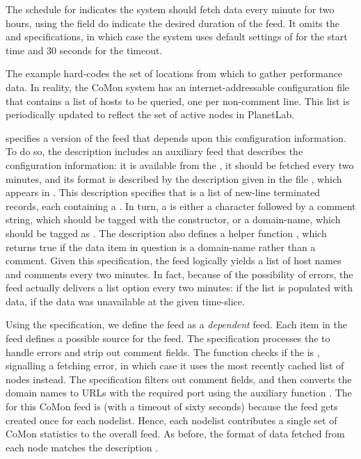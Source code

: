 The schedule for  indicates the system should fetch data
every minute for two hours, using the  field do indicate
the desired duration of the feed.  It omits the  and
 specifications, in which case the system uses default
settings of  for the start time and 30 seconds for the
timeout.  

The  example hard-codes the set of locations from
which to gather performance data.  In reality, the CoMon system has an
internet-addressable configuration file that contains a list of hosts
to be queried, one per non-comment line. This list is periodically
updated to reflect the set of active nodes in PlanetLab. 

 specifies a version of the  feed that
depends upon this configuration information.  To do so, the
description includes an auxiliary feed  that describes the
configuration information: it is available from the
, it should be fetched every two minutes, and its
format is described by the \padsml{} description  given in
the file , which appears in .
This \padsml{} description specifies that  is a list of
new-line terminated records, each containing a .  In
turn, a  is either a  character followed by a
comment string, which should be tagged with the 
constructor, or a domain-name, which should be tagged as
. The description also defines a helper function ,
which returns true if the data item in question is a domain-name
rather than a comment.  Given this specification, the  feed
logically yields a list of host names and comments every two minutes.
In fact, because of the possibility of errors, the feed actually
delivers a list option every two minutes:  if the list is
populated with data,  if the data was unavailable at the
given time-slice.

Using the  specification, we define the  feed as a
\textit{dependent} feed.  Each item in the  feed defines a
possible source for the  feed.  The  
specification processes the  to handle errors and strip out
comment fields.  The  function checks if the 
is , signalling a fetching error, in which case it uses
the most recently cached list of nodes instead.  The 
specification filters out comment fields, and then converts the domain
names to URLs with the required port using the auxiliary function
.  The  for this CoMon feed is 
(with a timeout of sixty seconds) because the feed gets created once
for each nodelist.  Hence, each nodelist contributes a single set
of CoMon statistics to the overall  feed. As before, the
format of data fetched from each node matches the description
.







